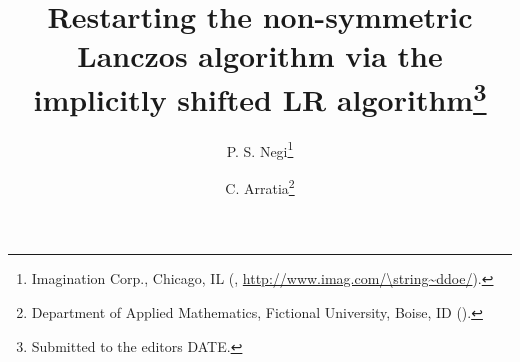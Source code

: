 

\usepackage{lipsum}
\usepackage{amsfonts}
\usepackage{graphicx}
\usepackage{epstopdf}
\usepackage{amsmath}
\usepackage{listings}
\usepackage{algpseudocode}%
\usepackage{placeins}
\ifpdf
\else
\fi

\newcommand{\creflastconjunction}{, and~}



\title{Restarting the non-symmetric Lanczos algorithm via the implicitly shifted LR algorithm\thanks{Submitted to the editors DATE.
}}

\author{P. S. Negi\thanks{Imagination Corp., Chicago, IL 
  (, \url{http://www.imag.com/\string~ddoe/}).}
\and C. Arratia\thanks{Department of Applied Mathematics, Fictional University, Boise, ID 
  ().}
}

\usepackage{amsopn}
\DeclareMathOperator{\diag}{diag}


